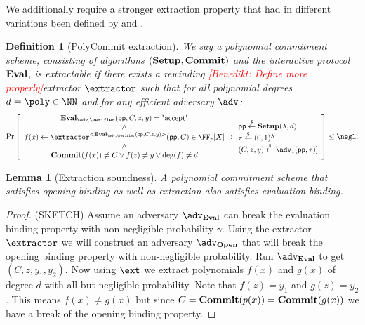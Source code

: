 \documentclass{article}
\newtheorem{definition}{Definition}
\newtheorem{lemma}{Lemma}
\newcommand{\benedikt}[1]{{\textcolor{red}{[Benedikt: #1]}}}
\newcommand{\benedikt}[1]{}
\begin{document}
We additionally require a stronger extraction property that had in different variations been defined by \cite{SP:ZGKPP17} and \cite{EPRINT:MBKM19}.
\begin{definition}[PolyCommit extraction]
We say a polynomial commitment scheme, consisting of algorithms $(\textbf{{Setup}},\textbf{{Commit}})$ and the interactive protocol $\textbf{{Eval}}$, is extractable if there exists a rewinding \benedikt{Define more properly}extractor $\extractor$ such that for all polynomial degrees $d=\poly\in \NN$ and for any efficient adversary $\adv$:
	\[        
                \Pr\left[\begin{array}{c}\eval_{\adv,\verifier}(\crs,C,z,y)=\text{"accept"}\\
                \wedge\\
                f(x)\gets\extractor^{<\eval_{\adv,\verifier}(\crs,C,z,y)>}(\crs,C)\in \FF_p[X]\\
                \wedge\\
               \commit(f(x))\neq C\vee f(z)\neq y \vee \deg(f)\neq d
                 \end{array}  : 
                \begin{array}{l} 
                      \crs \sample \setup(\lambda, d) \\
                      \tau \sample (0,1)^\lambda\\
                      (C,z,y)\sample \adv_1(\crs,\tau)]
                      
                \end{array} 
        \right] \leq \negl.
\]
\end{definition}
\begin{lemma}[Extraction soundness]
	A polynomial commitment scheme that satisfies opening binding as well as extraction also satisfies evaluation binding.
\end{lemma}
\begin{proof}
	(SKETCH) Assume an adversary $\adv_{\eval}$ can break the evaluation binding property with non negligible probability $\gamma$. Using the extractor $\extractor$ we will construct an adversary $\adv_\open$ that will break the opening binding property with non-negligible probability. Run $\adv_\eval$ to get $(C,z,y_1,y_2)$. Now using $\ext$ we extract polynomials $f(x)$ and $g(x)$ of degree $d$ with all but negligible probability. Note that $f(z)=y_1$ and $g(z)=y_2$. This means $f(x)\neq g(x)$ but since $C=\textbf{{Commit}}(p(x))=\textbf{{Commit}}(g(x))$ we have a break of the opening binding property.
\end{proof}
\end{document}
